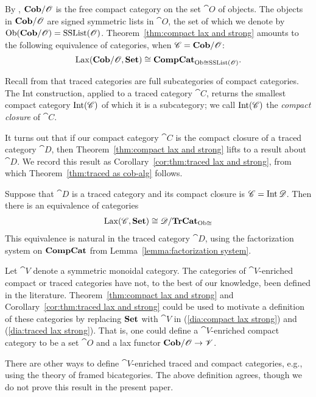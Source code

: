 \documentclass[12pt,oneside,article,draft]{memoir}
\begin{document}
By \cite{Abramsky}, $\mathbf{Cob}/\mathscr{O}$ is the free compact category on the set $\cat{O}$ of objects. The objects in $\mathbf{Cob}/\mathscr{O}$ are signed symmetric lists in $\cat{O}$, the set of which we denote by $\operatorname{Ob}(\mathbf{Cob}/\mathscr{O})=\textnormal{SSList}(\mathscr{O})$. Theorem~\ref{thm:compact lax and strong} amounts to the following equivalence of categories, when $\mathscr{C}=\mathbf{Cob}/\mathscr{O}$:
$$\operatorname{Lax}(\mathbf{Cob}/\mathscr{O},\mathbf{Set})\cong\mathbf{CompCat}_{{\operatorname{Ob}\cong}\textnormal{SSList}(\mathscr{O})}.$$

Recall from \cite{JoyalStreetVerity} that traced categories are full subcategories of compact categories. The Int construction, applied to a traced category $\cat{C}$, returns the smallest compact category $\operatorname{Int}(\mathscr{C})$ of which it is a subcategory; we call $\operatorname{Int}(\mathscr{C})$ the \emph{compact closure} of $\cat{C}$. 

It turns out that if our compact category $\cat{C}$ is the compact closure of a traced category $\cat{D}$, then Theorem~\ref{thm:compact lax and strong} lifts to a result about $\cat{D}$. We record this result as Corollary~\ref{cor:thm:traced lax and strong}, from which Theorem~\ref{thm:traced as cob-alg} follows. 

\begin{corollary}\label{cor:thm:traced lax and strong}
Suppose that $\cat{D}$ is a traced category and its compact closure is $\mathscr{C}=\operatorname{Int}\mathscr{D}$. Then there is an equivalence of categories
\begin{align}\label{dia:traced lax strong}
\operatorname{Lax}(\mathscr{C},\mathbf{Set})\cong\mathscr{D}/\mathbf{TrCat}_{{\operatorname{Ob}\cong}}
\end{align}
This equivalence is natural in the traced category $\cat{D}$, using the factorization system on $\mathbf{CompCat}$ from Lemma~\ref{lemma:factorization system}.
\end{corollary}

\begin{remark}

Let $\cat{V}$ denote a symmetric monoidal category. The categories of $\cat{V}$-enriched compact or traced categories have not, to the best of our knowledge, been defined in the literature. Theorem~\ref{thm:compact lax and strong} and Corollary~\ref{cor:thm:traced lax and strong} could be used to motivate a definition of these categories by replacing $\mathbf{Set}$ with $\cat{V}$ in (\ref{dia:compact lax strong}) and (\ref{dia:traced lax strong}). That is, one could define a $\cat{V}$-enriched compact category to be a set $\cat{O}$ and a lax functor $\mathbf{Cob}/\mathscr{O}\to\mathscr{V}$. 

There are other ways to define $\cat{V}$-enriched traced and compact categories, e.g., using the theory of framed bicategories. The above definition agrees, though we do not prove this result in the present paper.

\end{remark}
\end{document}
